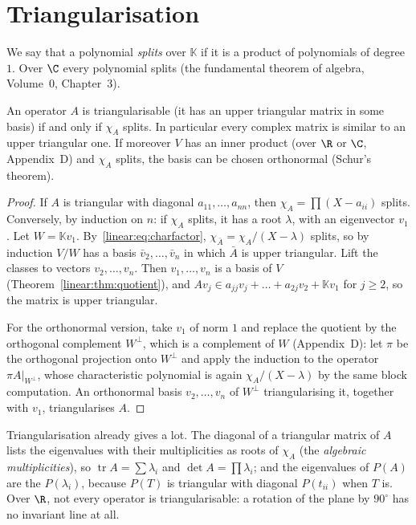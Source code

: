 \section{Triangularisation}

We say that a polynomial \emph{splits} over $\mathbb K$ if it is a product of polynomials of degree $1$. Over $\C$ every
polynomial splits (the fundamental theorem of algebra, Volume~0, Chapter~3).

\begin{theorem}[triangularisation]\label{linear:thm:schur}
An operator $A$ is triangularisable (it has an upper triangular matrix in some basis) if and only if $\chi_A$ splits.
In particular every complex matrix is similar to an upper triangular one. If moreover $V$ has an inner product (over $\R$
or $\C$, Appendix~D) and $\chi_A$ splits, the basis can be chosen orthonormal (Schur's theorem).
\end{theorem}
\begin{proof}
If $A$ is triangular with diagonal $a_{11},\dots,a_{nn}$, then $\chi_A=\prod(X-a_{ii})$ splits. Conversely, by induction on
$n$: if $\chi_A$ splits, it has a root $\lambda$, with an eigenvector $v_1$. Let $W=\mathbb Kv_1$. By~\eqref{linear:eq:charfactor},
$\chi_{\bar A}=\chi_A/(X-\lambda)$ splits, so by induction $V/W$ has a basis $\bar v_2,\dots,\bar v_n$ in which $\bar A$ is
upper triangular. Lift the classes to vectors $v_2,\dots,v_n$. Then $v_1,\dots,v_n$ is a basis of $V$ (Theorem~\ref{linear:thm:quotient}),
and $Av_j\in a_{jj}v_j+\dots+a_{2j}v_2+\mathbb Kv_1$ for $j\ge2$, so the matrix is upper triangular.

For the orthonormal version, take $v_1$ of norm $1$ and replace the quotient by the orthogonal complement $W^\perp$, which
is a complement of $W$ (Appendix~D): let $\pi$ be the orthogonal projection onto $W^\perp$ and apply the induction to
the operator $\pi A|_{W^\perp}$, whose characteristic polynomial is again $\chi_A/(X-\lambda)$ by the same block computation.
An orthonormal basis $v_2,\dots,v_n$ of $W^\perp$ triangularising it, together with $v_1$, triangularises $A$.
\end{proof}

Triangularisation already gives a lot. The diagonal of a triangular matrix of $A$ lists the eigenvalues with their
multiplicities as roots of $\chi_A$ (the \emph{algebraic multiplicities}), so $\operatorname{tr}A=\sum\lambda_i$ and
$\det A=\prod\lambda_i$; and the eigenvalues of $P(A)$ are the $P(\lambda_i)$, because $P(T)$ is triangular with diagonal
$P(t_{ii})$ when $T$ is. Over $\R$, not every operator is triangularisable: a rotation of the plane by $90^\circ$ has no
invariant line at all.

